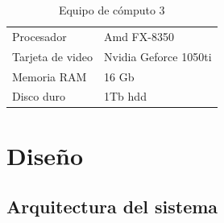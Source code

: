\documentclass[12pt, a4paper, titlepage]{report}
\begin{document}
            \begin{table}[H]
            	\begin{tabular}{|p{3.5cm}||p{10cm}|}
            		\rowcolor{guindapoli}
            		\multicolumn{2}{|c|}{\textbf{\textcolor{white}{Equipo de cómputo utilizado. [3]}}}\\
            		\hline
            		\rowcolor{azulclaro}Procesador & Amd FX-8350\\
            		\hline
            		\rowcolor{white}Tarjeta de video & Nvidia Geforce 1050ti\\
            		\hline
            		\rowcolor{azulclaro}Memoria RAM & 16 Gb\\
            		\hline
            		\rowcolor{white}Disco duro & 1Tb \acrshort{hdd}\\
            		\hline
            	\end{tabular}
            	\caption[Equipo de cómputo 3]{Equipo de cómputo 3}
            \end{table}
\newpage

\chapter{\textcolor{azulescom}{Diseño}}

\section{Arquitectura del sistema}
\end{document}
